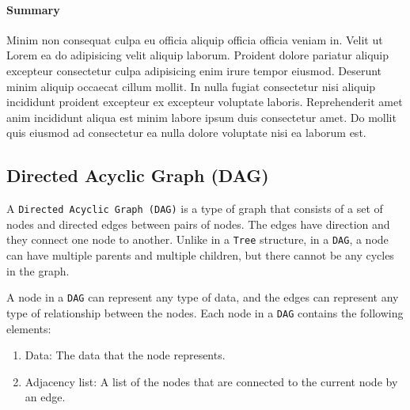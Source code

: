 \paragraph{Summary}
Minim non consequat culpa eu officia aliquip officia officia veniam in. Velit ut Lorem ea do adipisicing velit aliquip laborum. Proident dolore pariatur aliquip excepteur consectetur culpa adipisicing enim irure tempor eiusmod. Deserunt minim aliquip occaecat cillum mollit. In nulla fugiat consectetur nisi aliquip incididunt proident excepteur ex excepteur voluptate laboris. Reprehenderit amet anim incididunt aliqua est minim labore ipsum duis consectetur amet. Do mollit quis eiusmod ad consectetur ea nulla dolore voluptate nisi ea laborum est.

\subsection{Directed Acyclic Graph (DAG)}
A \lstinline{Directed Acyclic Graph (DAG)} is a type of graph that consists of a set of nodes and directed edges between pairs of nodes. The edges have direction and they connect one node to another.
Unlike in a \lstinline{Tree} structure, in a \lstinline{DAG}, a node can have multiple parents and multiple children, but there cannot be any cycles in the graph.

A node in a \lstinline{DAG} can represent any type of data, and the edges can represent any type of relationship between the nodes. Each node in a \lstinline{DAG} contains the following elements:
\begin{enumerate}
    \item Data: The data that the node represents.
    \item Adjacency list: A list of the nodes that are connected to the current node by an edge.
\end{enumerate}

